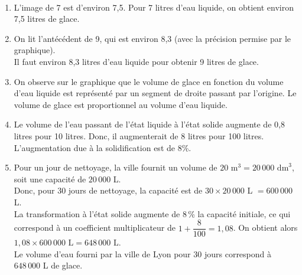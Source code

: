 \ \\ [-5mm]
   \begin{enumerate}
      \item L'image de 7 est d'environ 7,5. {\blue Pour 7 litres d'eau liquide, on obtient environ 7,5 litres de glace.}
      \item On lit l'antécédent de 9, qui est environ 8,3 (avec la précision permise par le graphique). \\
         {\blue Il faut environ 8,3 litres d'eau liquide pour obtenir 9 litres de glace.}
      \item On observe sur le graphique que le volume de glace en fonction du volume d'eau liquide est représenté par un segment de droite passant par l'origine. {\blue Le volume de glace est proportionnel au volume d'eau liquide.}
      \item Le volume de l'eau passant de l'état liquide à l'état solide augmente de 0,8 litres pour 10 litres. Donc, il augmenterait de 8 litres pour 100 litres. {\blue L'augmentation due à la solidification est de 8\%.}
      \item Pour un jour de nettoyage, la ville fournit un volume de $20 \text{ m}^3 = 20\,000 \text{ dm}^3$, soit une capacité de $20\,000$ L. \\
         Donc, pour 30 jours de nettoyage, la capacité est de $30\times 20\,000$ L $=600\,000$ L. \\
         La transformation à l'état solide augmente de 8\,\% la capacité initiale, ce qui correspond à un coefficient multiplicateur de $1+\dfrac{8}{100} =1,08$. On obtient alors $1,08\times600\,000 \text{ L} = 648\,000 \text{ L}$. \\ [1mm]
         {\blue Le volume d'eau fourni par la ville de Lyon pour $30$ jours correspond à $648\,000$ L de glace.}
   \end{enumerate}
